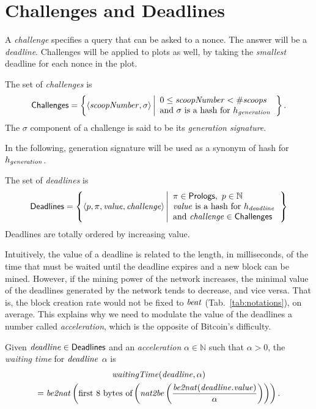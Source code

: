 \section{Challenges and Deadlines}\label{sec:challenges_and_deadlines}

A \emph{challenge} specifies a query that can be asked to a nonce.
The answer will be a \emph{deadline}.
Challenges will be applied to plots as well, by taking
the \emph{smallest} deadline for each nonce in the plot.
%
\begin{definition}[Challenge]\label{def:challenge}
  The set of \emph{challenges} is
  \[
  {\mathsf{Challenges}}=\left\{\langle{\mathit{scoopNumber}},\sigma\rangle\left|
  \begin{array}{l}
    0\le{\mathit{scoopNumber}}<{\#\mathit{scoops}}\\
    \text{and $\sigma$ is a hash for $h_{\mathit{generation}}$}
  \end{array}
  \right.\right\}.
  \]
  The $\sigma$ component of a challenge is said to be its \emph{generation signature}.
\end{definition}
%
In the following, generation signature will be used as a synonym of hash for $h_{\mathit{generation}}$.
%
\begin{definition}[Deadline]\label{def:deadline}
  The set of \emph{deadlines} is
  \[
  {\mathsf{Deadlines}}=\left\{
  \langle p,\pi,\mathit{value},{\mathit{challenge}}\rangle
  \left|\begin{array}{l}
  \pi\in{\mathsf{Prologs}},\ p\in\mathbb{N}\\
  \mathit{value}\text{ is a hash for }h_{\mathit{deadline}}\\
  \text{and }{\mathit{challenge}}\in{\mathsf{Challenges}}
  \end{array}
  \right.
  \right\}
  \]
  Deadlines are totally ordered by increasing value.
\end{definition}
%
Intuitively, the value of a deadline is related to the length, in milliseconds, of the time
that must be waited until the deadline expires and a new block can be mined.
However, if the mining power of the network increases, the minimal value of the deadlines
generated by the network
tends to decrease, and vice versa. That is, the block creation rate would not be
fixed to ${\mathit{beat}}$ (Tab.~\ref{tab:notations}), on average.
This explains why we need to modulate the value of the deadlines \wrt a number
called \emph{acceleration}, which is the opposite of Bitcoin's difficulty.
%
\begin{definition}\label{def:deadline}
  Given ${\mathit{deadline}}\in{\mathsf{Deadlines}}$ and an \emph{acceleration}
  $\alpha\in\mathbb{N}$ such that $\alpha>0$, the
  \emph{waiting time} for ${\mathit{deadline}}$ \wrt $\alpha$ is
  \begin{multline*}
    {\mathit{waitingTime}}({\mathit{deadline}},\alpha)\\
    ={\mathit{be2nat}}\left(\text{first $8$ bytes of}\left({\mathit{nat2be}}\left(\frac{{\mathit{be2nat}}({\mathit{deadline}}.\mathit{value})}{\alpha}\right)\right)\right).
  \end{multline*}
\end{definition}
